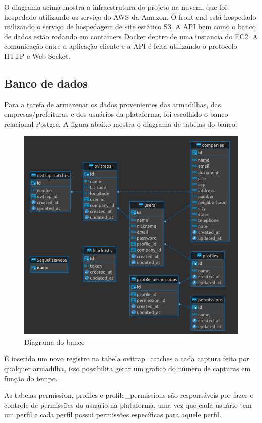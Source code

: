 \documentclass[
	12pt,				%
	openright,			%
	oneside,			%
	a4paper,			%
	chapter=TITLE,		%
	english,			%
	brazil				%
	]{abntex2}
\begin{document}
O diagrama acima mostra a infraestrutura do projeto na nuvem, que foi hospedado utilizando os serviço do AWS da Amazon. O front-end está hospedado
utilizando o serviço de hospedagem de site estático S3. A API bem como o banco de dados estão rodando em containers Docker dentro de 
uma instancia do EC2. A comunicação entre a aplicação cliente e a API é feita utilizando o protocolo HTTP e Web Socket.

\subsection{Banco de dados}

Para a tarefa de armazenar os dados provenientes das armadilhas, das empresas/prefeituras e dos usuários da plataforma, 
foi escolhido o banco relacional Postgre. A figura abaixo mostra o diagrama de tabelas do banco:

\begin{figure}[H]
\centering
\includegraphics[scale=0.5]{imagens/EsquemaBanco.png}
\caption{Diagrama do banco}
    \label{fig:banco}
\end{figure}

É inserido um novo registro na tabela ovitrap\_catches a cada captura feita por qualquer armadilha, isso possibilita gerar um grafico do 
número de capturas em função do tempo.

As tabelas permission, profiles e profile\_permissions são responsáveis por fazer o controle de permissões do usuário na plataforma, 
uma vez que cada usuário tem um perfil e cada perfil possui permissões específicas para aquele perfil. 
\end{document}

